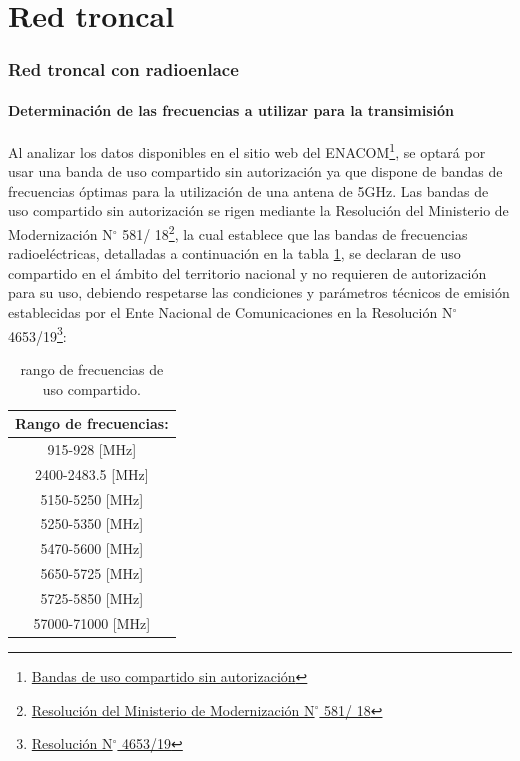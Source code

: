 \documentclass[11pt,a4paper]{article}
\begin{document}
 \clearpage 

 \part{Red troncal}

\section{Red troncal con radioenlace}

\subsection{Determinación de las frecuencias a utilizar para la transimisión}

Al analizar los datos disponibles en el sitio web del ENACOM\footnote{\href{https://www.enacom.gob.ar/bandas-de-uso-compartido-sin-autorizacion_p680}{Bandas de uso compartido sin autorización}}, se optará por usar una banda de uso compartido sin autorización ya que dispone de bandas de frecuencias óptimas para la utilización de una antena de 5GHz. 
Las bandas de uso compartido sin autorización se rigen mediante la Resolución del Ministerio de Modernización N$\mathrm{{}^\circ}$ 581/ 18\footnote{\href{https://www.argentina.gob.ar/normativa/nacional/resolución-581-2018-314174}{Resolución del Ministerio de Modernización N$\mathrm{{}^\circ}$ 581/ 18}}, la cual establece que las bandas de frecuencias radioeléctricas, detalladas a continuación en la tabla \ref{tab:frec_libres}, se declaran de uso compartido en el ámbito del territorio nacional y no requieren de autorización para su uso, debiendo respetarse las condiciones y parámetros técnicos de emisión establecidas por el Ente Nacional de Comunicaciones en la Resolución N$\mathrm{{}^\circ}$ 4653/19\footnote{\href{https://www.enacom.gob.ar/multimedia/normativas/2019/res4653.pdf}{Resolución N$\mathrm{{}^\circ}$ 4653/19}}:

\begin{table}[htbp]
  \centering
\begin{tabular}{|c|} \hline 
Rango de frecuencias: \\ \hline 
915-928 [MHz] \\ \hline 
2400-2483.5 [MHz] \\ \hline 
5150-5250 [MHz] \\ \hline 
5250-5350 [MHz] \\ \hline 
5470-5600 [MHz] \\ \hline 
5650-5725 [MHz] \\ \hline 
5725-5850 [MHz] \\ \hline 
57000-71000 [MHz] \\ \hline
\end{tabular}
\caption{rango de frecuencias de uso compartido.}
\label{tab:frec_libres}
\end{table}%
\end{document}
